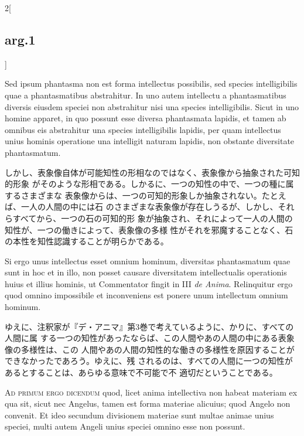 \documentclass[paper=a4paper,fontsize=10pt,jafontsize=9pt,titlepage]{jlreq}
\begin{document}
\begin{paracol}{2}[\subsection{arg.1}]
\switchcolumn*

 Sed ipsum phantasma non est forma intellectus possibilis, sed species
 intelligibilis quae a phantasmatibus abstrahitur. In uno autem intellectu a
 phantasmatibus diversis eiusdem speciei non abstrahitur nisi una species
 intelligibilis. Sicut in uno homine apparet, in quo possunt esse diversa
 phantasmata lapidis, et tamen ab omnibus eis abstrahitur una species
 intelligibilis lapidis, per quam intellectus unius hominis operatione una
 intelligit naturam lapidis, non obstante diversitate phantasmatum.

\switchcolumn

 しかし、表象像自体が可能知性の形相なのではなく、表象像から抽象された可知的形象
 がそのような形相である。しかるに、一つの知性の中で、一つの種に属するさまざまな
 表象像からは、一つの可知的形象しか抽象されない。たとえば、一人の人間の中には石
 のさまざまな表象像が存在しうるが、しかし、それらすべてから、一つの石の可知的形
 象が抽象され、それによって一人の人間の知性が、一つの働きによって、表象像の多様
 性がそれを邪魔することなく、石の本性を知性認識することが明らかである。
 
\switchcolumn*


 Si ergo unus intellectus esset omnium hominum, diversitas phantasmatum quae
 sunt in hoc et in illo, non posset causare diversitatem intellectualis
 operationis huius et illius hominis, ut Commentator fingit in III {\itshape de
 Anima}. Relinquitur ergo quod omnino impossibile et inconveniens est ponere
 unum intellectum omnium hominum.

\switchcolumn

ゆえに、注釈家が『デ・アニマ』第3巻で考えているように、かりに、すべての人間に属
する一つの知性があったならば、この人間やあの人間の中にある表象像の多様性は、この
人間やあの人間の知性的な働きの多様性を原因することができなかったであろう。ゆえに、残
されるのは、すべての人間に一つの知性があるとすることは、あらゆる意味で不可能で不
適切だということである。
 
\switchcolumn*[\subsection{ad 1}]


{\scshape Ad primum ergo dicendum} quod, licet anima intellectiva non habeat
materiam ex qua sit, sicut nec Angelus, tamen est forma materiae alicuius; quod
Angelo non convenit. Et ideo secundum divisionem materiae sunt multae animae
unius speciei, multi autem Angeli unius speciei omnino esse non possunt.


\end{paracol}
\end{document}
